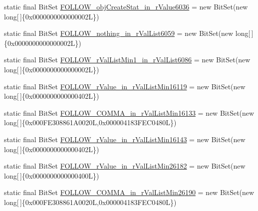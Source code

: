 \begin{DoxyCompactItemize}
\item 
static final Bit\-Set \hyperlink{classorg_1_1tzi_1_1use_1_1parser_1_1testsuite_1_1_test_suite_parser_af06d546d33f99af24e9db3dfddd0298c}{F\-O\-L\-L\-O\-W\-\_\-obj\-Create\-Stat\-\_\-in\-\_\-r\-Value6036} = new Bit\-Set(new long\mbox{[}$\,$\mbox{]}\{0x0000000000000002\-L\})
\item 
static final Bit\-Set \hyperlink{classorg_1_1tzi_1_1use_1_1parser_1_1testsuite_1_1_test_suite_parser_aaf8e7487ae9dfa0428810c80341d64eb}{F\-O\-L\-L\-O\-W\-\_\-nothing\-\_\-in\-\_\-r\-Val\-List6059} = new Bit\-Set(new long\mbox{[}$\,$\mbox{]}\{0x0000000000000002\-L\})
\item 
static final Bit\-Set \hyperlink{classorg_1_1tzi_1_1use_1_1parser_1_1testsuite_1_1_test_suite_parser_ad9374ba2ba1836ef6bc5c4a4d13cacab}{F\-O\-L\-L\-O\-W\-\_\-r\-Val\-List\-Min1\-\_\-in\-\_\-r\-Val\-List6086} = new Bit\-Set(new long\mbox{[}$\,$\mbox{]}\{0x0000000000000002\-L\})
\item 
static final Bit\-Set \hyperlink{classorg_1_1tzi_1_1use_1_1parser_1_1testsuite_1_1_test_suite_parser_a46f6bea4f8b40a37fca2207aba9e4453}{F\-O\-L\-L\-O\-W\-\_\-r\-Value\-\_\-in\-\_\-r\-Val\-List\-Min16119} = new Bit\-Set(new long\mbox{[}$\,$\mbox{]}\{0x0000000000000402\-L\})
\item 
static final Bit\-Set \hyperlink{classorg_1_1tzi_1_1use_1_1parser_1_1testsuite_1_1_test_suite_parser_a4cae1fcf72c968e443e2ebdfacbe2f41}{F\-O\-L\-L\-O\-W\-\_\-\-C\-O\-M\-M\-A\-\_\-in\-\_\-r\-Val\-List\-Min16133} = new Bit\-Set(new long\mbox{[}$\,$\mbox{]}\{0x000\-F\-E308861\-A0020\-L,0x000004183\-F\-E\-C0480\-L\})
\item 
static final Bit\-Set \hyperlink{classorg_1_1tzi_1_1use_1_1parser_1_1testsuite_1_1_test_suite_parser_ac7f5a095edb612607b09033f11c6cbbd}{F\-O\-L\-L\-O\-W\-\_\-r\-Value\-\_\-in\-\_\-r\-Val\-List\-Min16143} = new Bit\-Set(new long\mbox{[}$\,$\mbox{]}\{0x0000000000000402\-L\})
\item 
static final Bit\-Set \hyperlink{classorg_1_1tzi_1_1use_1_1parser_1_1testsuite_1_1_test_suite_parser_a72ee8f7b16a61565d860bd2d26a4392c}{F\-O\-L\-L\-O\-W\-\_\-r\-Value\-\_\-in\-\_\-r\-Val\-List\-Min26182} = new Bit\-Set(new long\mbox{[}$\,$\mbox{]}\{0x0000000000000400\-L\})
\item 
static final Bit\-Set \hyperlink{classorg_1_1tzi_1_1use_1_1parser_1_1testsuite_1_1_test_suite_parser_a3d0ad5db0c8290b500ae5d1aa89a15fb}{F\-O\-L\-L\-O\-W\-\_\-\-C\-O\-M\-M\-A\-\_\-in\-\_\-r\-Val\-List\-Min26190} = new Bit\-Set(new long\mbox{[}$\,$\mbox{]}\{0x000\-F\-E308861\-A0020\-L,0x000004183\-F\-E\-C0480\-L\})

\end{DoxyCompactItemize}
